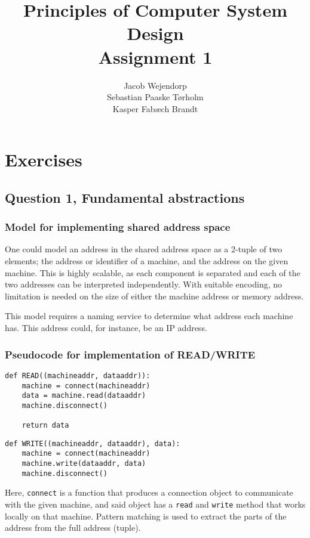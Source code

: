 \documentclass[11pt,a4paper]{article}
\title{Principles of Computer System Design\\Assignment 1}
\author{Jacob Wejendorp\\Sebastian Paaske Tørholm\\Kasper Fabæch Brandt}
\begin{document}
\maketitle
\section{Exercises}
\subsection{Question 1, Fundamental abstractions}
\subsubsection{Model for implementing shared address space}
One could model an address in the shared address space as a 2-tuple of two
elements; the address or identifier of a machine, and the address on the given
machine. This is highly scalable, as each component is separated and each of
the two addresses can be interpreted independently. With suitable encoding,
no limitation is needed on the size of either the machine address or memory
address.

This model requires a naming service to determine what address each machine
has. This address could, for instance, be an IP address.

\subsubsection{Pseudocode for implementation of READ/WRITE}

\begin{verbatim}
def READ((machineaddr, dataaddr)):
    machine = connect(machineaddr)
    data = machine.read(dataaddr)
    machine.disconnect()

    return data
\end{verbatim}

\begin{verbatim}
def WRITE((machineaddr, dataaddr), data):
    machine = connect(machineaddr)
    machine.write(dataaddr, data)
    machine.disconnect()
\end{verbatim}

Here, \texttt{connect} is a function that produces a connection object to
communicate with the given machine, and said object has a \texttt{read} and
\texttt{write} method that works locally on that machine.
Pattern matching is used to extract the parts of the address from the full
address (tuple).
\end{document}
